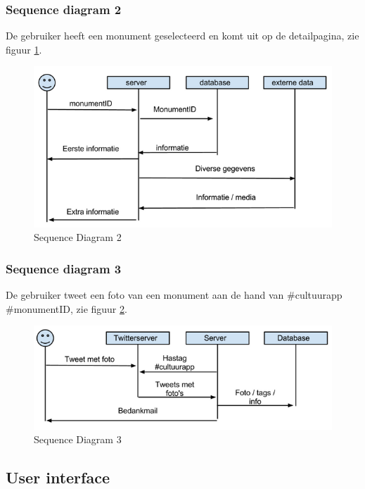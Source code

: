 \documentclass[a4paper,10pt]{article}
\begin{document}
			\subsubsection{Sequence diagram 2}
			De gebruiker heeft een monument geselecteerd en komt uit op de detailpagina, zie figuur \ref{sequence2}.
			\begin{figure}[ht!]
				\centering
				\includegraphics[width=\textwidth]{sequence2.png}
				\caption{Sequence Diagram 2 \label{sequence2}}
			\end{figure}
			\subsubsection{Sequence diagram 3}
			De gebruiker tweet een foto van een monument aan de hand van \#cultuurapp \#monumentID, zie figuur \ref{sequence3}.
			\begin{figure}[ht!]
				\centering
				\includegraphics[width=\textwidth]{sequence3.png}
				\caption{Sequence Diagram 3 \label{sequence3}}
			\end{figure}
		
		\clearpage			
		\subsection{User interface}
\end{document}
